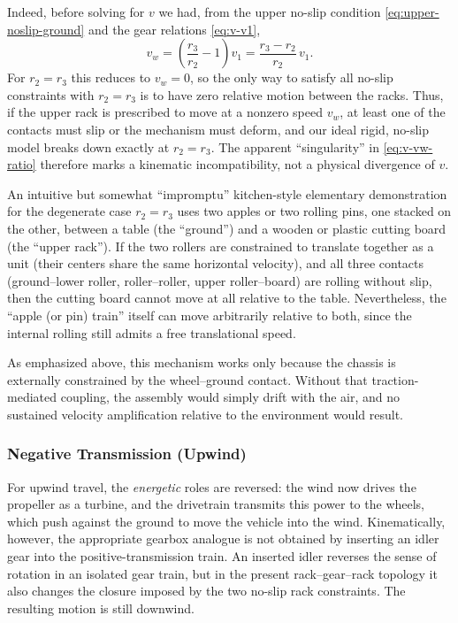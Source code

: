 \documentclass[reprint,aps,pra,longbibliography]{revtex4-2}
\begin{document}
Indeed, before solving for $v$ we had, from the upper no-slip condition
\eqref{eq:upper-noslip-ground} and the gear relations \eqref{eq:v-v1},
\[
v_w = \left(\frac{r_3}{r_2} - 1\right)v_1
     = \frac{r_3 - r_2}{r_2}\,v_1.
\]
For $r_2 = r_3$ this reduces to  $v_w = 0$,
so the only way to satisfy all no-slip constraints with $r_2 = r_3$ is to
have zero relative motion between the racks. Thus, if the upper rack is
prescribed to move at a nonzero speed $v_w$, at least one of the contacts
must slip or the mechanism must deform, and our ideal rigid, no-slip model
breaks down exactly at $r_2 = r_3$. The apparent ``singularity'' in
\eqref{eq:v-vw-ratio} therefore marks a kinematic incompatibility, not a
physical divergence of $v$.

An intuitive but somewhat ``impromptu'' kitchen-style elementary demonstration for the degenerate case $r_2 = r_3$ uses two apples or two rolling pins, one stacked on the other, between a table (the ``ground'') and a wooden or plastic cutting board (the ``upper rack'').
If the two rollers are constrained to translate together as a unit (their centers share the same horizontal velocity), and all three contacts (ground--lower roller, roller--roller, upper roller--board) are rolling without slip, then the cutting board cannot move at all relative to the table. Nevertheless, the ``apple (or pin) train'' itself can move arbitrarily relative to both, since the internal rolling still admits a free translational speed.

As emphasized above, this mechanism works only because the chassis is externally
constrained by the wheel--ground contact. Without that traction-mediated
coupling, the assembly would simply drift with the air, and no sustained
velocity amplification relative to the environment would result.

\subsubsection{Negative Transmission (Upwind)}

For upwind travel, the \emph{energetic} roles are reversed: the wind now drives
the propeller as a turbine, and the drivetrain transmits this power to the
wheels, which push against the ground to move the vehicle into the wind.
Kinematically, however, the appropriate gearbox analogue is not obtained by
inserting an idler gear into the positive-transmission train.  An inserted
idler reverses the sense of rotation in an isolated gear train, but in the
present rack--gear--rack topology it also changes the closure imposed by the
two no-slip rack constraints.  The resulting motion is still downwind.
\end{document}
